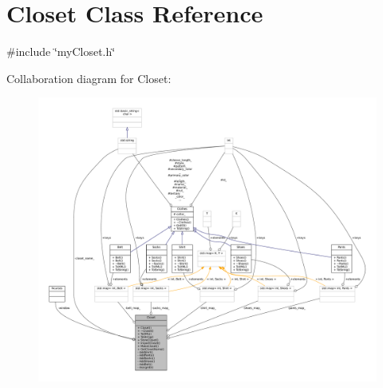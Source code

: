\hypertarget{classCloset}{}\section{Closet Class Reference}
\label{classCloset}


{\ttfamily \#include \char`\"{}my\+Closet.\+h\char`\"{}}



Collaboration diagram for Closet\+:
\nopagebreak
\begin{figure}[H]
\begin{center}
\leavevmode
\includegraphics[width=350pt]{classCloset__coll__graph}
\end{center}
\end{figure}
